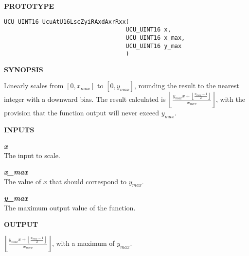 %

\noindent\textbf{PROTOTYPE}
\begin {list}{}{\setlength{\leftmargin}{0.25in}\setlength{\topsep}{0.0in}}
\item
\begin{verbatim}
UCU_UINT16 UcuAtU16LscZyiRAxdAxrRxx(
                                   UCU_UINT16 x, 
                                   UCU_UINT16 x_max, 
                                   UCU_UINT16 y_max
                                   )
\end{verbatim}
\end{list}
\vspace{2.8ex}

\noindent\textbf{SYNOPSIS}
\begin{list}{}{\setlength{\leftmargin}{0.25in}\setlength{\topsep}{0.0in}}
\item Linearly scales from $[0, x_{max}]$ to $[0, y_{max}]$, rounding the result
      to the nearest integer with a downward bias.  The result calculated is
      $\displaystyle{\left\lfloor \frac{y_{max} x + \left\lfloor \displaystyle{\frac{x_{max} - 1}{2}} \right\rfloor}{x_{max}} \right\rfloor}$,
      with the provision that the function output will never exceed $y_{max}$.
\end{list}
\vspace{2.8ex}

\noindent\textbf{INPUTS}
\begin{list}{}{\setlength{\leftmargin}{0.5in}\setlength{\itemindent}{-0.25in}\setlength{\topsep}{0.0in}\setlength{\partopsep}{0.0in}}
\item \emph{\textbf{x}}\\
      The input to scale.
\item \emph{\textbf{x\_max}}\\
      The value of $x$ that should correspond to $y_{max}$.
\item \emph{\textbf{y\_max}}\\
      The maximum output value of the function.
\end{list}
\vspace{2.8ex}

\noindent\textbf{OUTPUT}
\begin{list}{}{\setlength{\leftmargin}{0.25in}\setlength{\topsep}{0.0in}}
\item       $\displaystyle{\left\lfloor \frac{y_{max} x + \left\lfloor \displaystyle{\frac{x_{max} - 1}{2}} \right\rfloor}{x_{max}} \right\rfloor}$,
            with a maximum of $y_{max}$.
\end{list}
\vspace{2.8ex}

